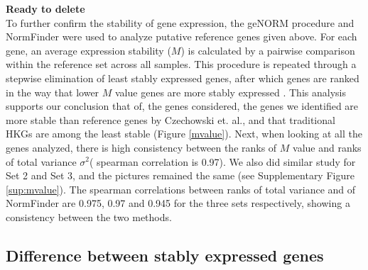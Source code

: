 \documentclass[11pt, a4paper]{article}
\begin{document}
\textbf{Ready to delete} \\
To further confirm the stability of gene expression, the geNORM \citep{vandesompele2002accurate} procedure and %
NormFinder \citep{andersen2004normalization} 
 were used to analyze putative reference genes given above.  For each gene, an average expression stability ($M$) is calculated by a pairwise comparison within the reference set across all samples. This procedure is repeated through a stepwise elimination of least stably expressed genes, after which genes are ranked in the way that lower $M$ value genes are more stably expressed \citep{vandesompele2002accurate}. This analysis supports our conclusion that of, the genes considered, the genes we identified are more stable than reference genes by Czechowski et. al., and that traditional HKGs are among the least stable (Figure \ref{mvalue}). Next, when looking at all the genes analyzed, there is high consistency between the ranks of $M$ value and ranks of total variance $\sigma^2$( spearman correlation is 0.97). We also did similar study for Set 2 and Set 3, and the pictures remained the same (see Supplementary Figure \ref{sup:mvalue}). The spearman correlations  between ranks of total variance and of NormFinder are 0.975, 0.97 and 0.945 for the three sets respectively, showing a consistency between the two methods. 


\subsection{Difference between stably expressed genes}
\end{document}
